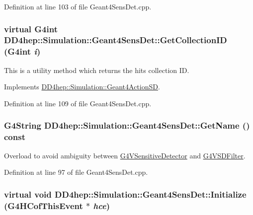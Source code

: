 Definition at line 103 of file Geant4SensDet.cpp.\hypertarget{class_d_d4hep_1_1_simulation_1_1_geant4_sens_det_acabf73f9ac2fd034b02bb24d12db8347}{
\subsubsection[{GetCollectionID}]{\setlength{\rightskip}{0pt plus 5cm}virtual G4int DD4hep::Simulation::Geant4SensDet::GetCollectionID (G4int {\em i})}}
\label{class_d_d4hep_1_1_simulation_1_1_geant4_sens_det_acabf73f9ac2fd034b02bb24d12db8347}


This is a utility method which returns the hits collection ID. 

Implements \hyperlink{class_d_d4hep_1_1_simulation_1_1_geant4_action_s_d_ac0539610b17b20d10592201b1eb0755d}{DD4hep::Simulation::Geant4ActionSD}.

Definition at line 109 of file Geant4SensDet.cpp.\hypertarget{class_d_d4hep_1_1_simulation_1_1_geant4_sens_det_a7cac5ff88bc88592fbf0ddef35d2f377}{
\subsubsection[{GetName}]{\setlength{\rightskip}{0pt plus 5cm}G4String DD4hep::Simulation::Geant4SensDet::GetName () const}}
\label{class_d_d4hep_1_1_simulation_1_1_geant4_sens_det_a7cac5ff88bc88592fbf0ddef35d2f377}


Overload to avoid ambiguity between \hyperlink{class_g4_v_sensitive_detector}{G4VSensitiveDetector} and \hyperlink{class_g4_v_s_d_filter}{G4VSDFilter}. 

Definition at line 97 of file Geant4SensDet.cpp.\hypertarget{class_d_d4hep_1_1_simulation_1_1_geant4_sens_det_a64413a736de8cc5d193bf097595ae5d4}{
\subsubsection[{Initialize}]{\setlength{\rightskip}{0pt plus 5cm}virtual void DD4hep::Simulation::Geant4SensDet::Initialize (G4HCofThisEvent $\ast$ {\em hce})}}
\label{class_d_d4hep_1_1_simulation_1_1_geant4_sens_det_a64413a736de8cc5d193bf097595ae5d4}


